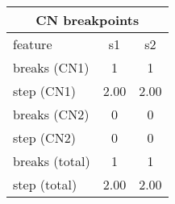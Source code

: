 \documentclass{standalone}
\begin{document}
\begin{tabular}{|l|c|c|}
\hline
\multicolumn{3}{|c|}{\textbf{CN breakpoints}}\\
\hline 

feature & s1 & s2 \\
\hline
breaks (CN1) & 1 & 1 \\
step (CN1) & 2.00 & 2.00 \\
breaks (CN2) & 0 & 0 \\
step (CN2) & 0 & 0 \\
breaks (total) & 1 & 1 \\
step (total) & 2.00 & 2.00 \\
\hline
\end{tabular}
\end{document}
